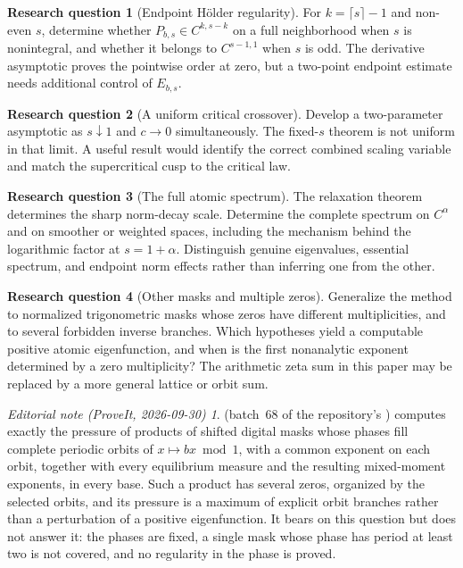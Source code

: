 \documentclass[11pt,a4paper]{article}
\numberwithin{equation}{section}
\theoremstyle{definition}
\newtheorem{question}{Research question}
\theoremstyle{remark}
\newtheorem*{ednote}{Editorial note (ProveIt, 2026-09-30)}
\begin{document}
\begin{question}[Endpoint H\"older regularity]
For $k=\lceil s\rceil-1$ and non-even $s$, determine whether
$P_{b,s}\in C^{k,s-k}$ on a full neighborhood when $s$ is nonintegral,
and whether it belongs to $C^{s-1,1}$ when $s$ is odd. The derivative
asymptotic proves the pointwise order at zero, but a two-point endpoint
estimate needs additional control of $E_{b,s}$.
\end{question}

\begin{question}[A uniform critical crossover]
Develop a two-parameter asymptotic as $s\downarrow1$ and $c\to0$
simultaneously. The fixed-$s$ theorem is not uniform in that limit.
A useful result would identify the correct combined scaling variable and
match the supercritical cusp to the critical law.
\end{question}

\begin{question}[The full atomic spectrum]
The relaxation theorem determines the sharp norm-decay scale. Determine
the complete spectrum on $C^\alpha$ and on smoother or weighted spaces,
including the mechanism behind the logarithmic factor at
$s=1+\alpha$. Distinguish genuine eigenvalues, essential spectrum, and
endpoint norm effects rather than inferring one from the other.
\end{question}

\begin{question}[Other masks and multiple zeros]
Generalize the method to normalized trigonometric masks whose zeros have
different multiplicities, and to several forbidden inverse branches.
Which hypotheses yield a computable positive atomic eigenfunction, and
when is the first nonanalytic exponent determined by a zero multiplicity?
The arithmetic zeta sum in this paper may be replaced by a more general
lattice or orbit sum.
\end{question}
\begin{ednote}
 (batch~68 of
the repository's ) computes exactly the pressure of
products of shifted digital masks whose phases fill complete periodic
orbits of $x\mapsto bx\bmod1$, with a common exponent on each orbit,
together with every equilibrium measure and the resulting mixed-moment
exponents, in every base. Such a product has several zeros, organized by the selected orbits, and its pressure is a maximum of explicit orbit branches rather than a perturbation of a positive eigenfunction. It bears on this question but does not
answer it: the phases are fixed, a single mask whose phase has period at
least two is not covered, and no regularity in the phase is proved.
\end{ednote}
\end{document}
